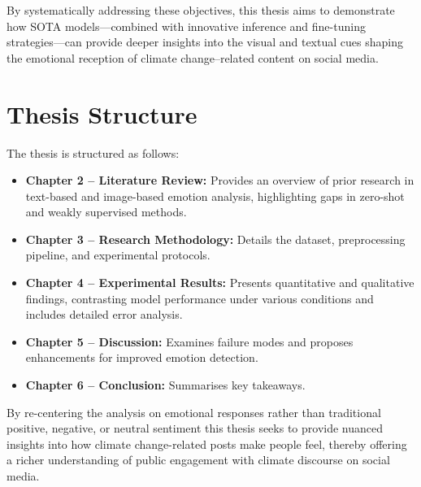 By systematically addressing these objectives, this thesis aims to demonstrate how SOTA models—combined with innovative inference and fine-tuning strategies—can provide deeper insights into the visual and textual cues shaping the emotional reception of climate change–related content on social media.

\section{Thesis Structure}

The thesis is structured as follows:

\begin{itemize}
    \item \textbf{Chapter 2 – Literature Review:} Provides an overview of prior research in text-based and image-based emotion analysis, highlighting gaps in zero-shot and weakly supervised methods.
    \item \textbf{Chapter 3 – Research Methodology:} Details the dataset, preprocessing pipeline, and experimental protocols.
    \item \textbf{Chapter 4 – Experimental Results:} Presents quantitative and qualitative findings, contrasting model performance under various conditions and includes detailed error analysis.
    \item \textbf{Chapter 5 – Discussion:} Examines failure modes and proposes enhancements for improved emotion detection.
    \item \textbf{Chapter 6 – Conclusion:} Summarises key takeaways.
\end{itemize}

By re-centering the analysis on emotional responses rather than traditional positive, negative, or neutral sentiment this thesis seeks to provide nuanced insights into how climate change-related posts make people feel, thereby offering a richer understanding of public engagement with climate discourse on social media.